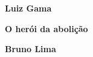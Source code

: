 \textbf{Luiz Gama} \lipsum[1]

\textbf{O herói da abolição} \lipsum[2]

\textbf{Bruno Lima} \lipsum[3]


